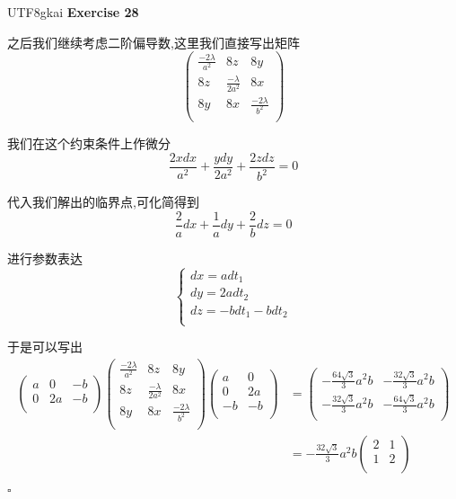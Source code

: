 \documentclass[11pt,hyperref,a4paper,UTF8]{ctexart}
\newenvironment{exercise}[1]{%
{\textbf{Exercise #1} \\ 
    }
}{
  \hfill $\square$ 
  \par\bigskip 
}
\begin{document}
\begin{CJK}{UTF8}{gkai}
\begin{exercise}{28}
    之后我们继续考虑二阶偏导数,这里我们直接写出矩阵
    \[\begin{pmatrix}
        \frac{-2\lambda}{a^2}&8z&8y\\
        8z&\frac{-\lambda}{2a^2}&8x\\
        8y&8x&\frac{-2\lambda}{b^2}\\
    \end{pmatrix}\]

    我们在这个约束条件上作微分
    \[\frac{2xdx}{a^2} + \frac{ydy}{2 a^2} + \frac{2zdz}{b^2} = 0\]

    代入我们解出的临界点,可化简得到
    \[\frac{2}{a}dx + \frac{1}{a}dy + \frac{2}{b}dz = 0\]

    进行参数表达
    \[\begin{cases}
        dx = adt_1\\
        dy = 2adt_2\\
        dz = -bdt_1 - bdt_2 \\
    \end{cases}\]

    于是可以写出
    \[
    \begin{aligned} 
    \begin{pmatrix}
        a&0&-b\\
        0&2a&-b\\
    \end{pmatrix}
    \begin{pmatrix}
        \frac{-2\lambda}{a^2}&8z&8y\\
        8z&\frac{-\lambda}{2a^2}&8x\\
        8y&8x&\frac{-2\lambda}{b^2}\\
    \end{pmatrix}
    \begin{pmatrix}
        a&0\\
        0&2a\\
        -b&-b\\
    \end{pmatrix}
    &=
    \begin{pmatrix}
        -\frac{64\sqrt{3}}{3}a^2 b&-\frac{32\sqrt{3}}{3}a^2 b\\
        -\frac{32\sqrt{3}}{3}a^2 b&-\frac{64\sqrt{3}}{3}a^2 b\\
    \end{pmatrix}\\
    &=
    -\frac{32\sqrt{3}}{3}a^2 b
    \begin{pmatrix}
        2&1\\
        1&2\\
    \end{pmatrix}
    \end{aligned}   
    \]


\end{exercise}
\end{CJK}
\end{document}
